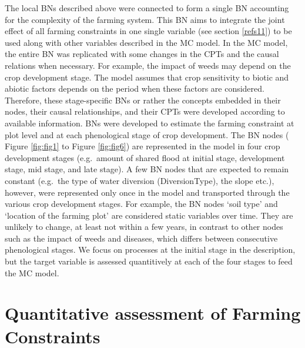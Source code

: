 \documentclass[]{elsarticle} %
\begin{document}
The local BNs described above were connected to form a single BN accounting for the complexity of the farming system. This BN aims to integrate the joint effect of all farming constraints in one single variable (see section \ref{refs11}) to be used along with other variables described in the MC model. In the MC model, the entire BN was replicated with some changes in the CPTs and the causal relations when necessary. For example, the impact of weeds may depend on the crop development stage. The model assumes that crop sensitivity to biotic and abiotic factors depends on the period when these factors are considered. Therefore, these stage-specific BNs or rather the concepts embedded in their nodes, their causal relationships, and their CPTs were developed according to available information. BNs were developed to estimate the farming constraint at plot level and at each phenological stage of crop development. The BN nodes ( Figure \ref{fig:fig1} to Figure \ref{fig:fig6}) are represented in the model in four crop development stages (e.g.~amount of shared flood at initial stage, development stage, mid stage, and late stage). A few BN nodes that are expected to remain constant (e.g.~the type of water diversion (DiversionType), the slope etc.), however, were represented only once in the model and transported through the various crop development stages. For example, the BN nodes `soil type' and `location of the farming plot' are considered static variables over time. They are unlikely to change, at least not within a few years, in contrast to other nodes such as the impact of weeds and diseases, which differs between consecutive phenological stages. We focus on processes at the initial stage in the description, but the target variable is assessed quantitively at each of the four stages to feed the MC model.

\hypertarget{refs3}{%
\section{Quantitative assessment of Farming Constraints}\label{refs3}}
\end{document}
